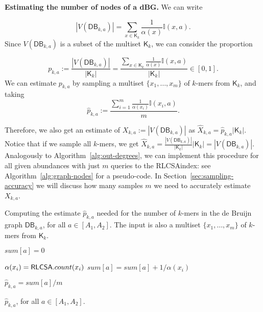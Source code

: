 \documentclass[a4paper,11pt]{article}
\newcommand{\DB}{\mathsf{DB}_{k,a}}
\newcommand{\K}{\mathsf{K}}
\newcommand{\abu}{\alpha}
\newcommand{\RLCSA}{{\sf RLCSA}}
\renewcommand{\geq}{\geqslant}
\begin{document}

\noindent \textbf{Estimating the number of nodes of a dBG.} We can write

\[|V(\DB)| = \sum_{x \in \K_k} \frac{1}{\abu(x)}\mathbb{I}(x,a).\]
Since $V(\DB)$ is a subset of the multiset $\K_k$, we can consider the proportion 

\[p_{k,a} := \frac{|V(\DB)|}{|\K_k|} = \frac{\sum_{x \in \K_k} \frac{1}{\abu(x)}\mathbb{I}(x,a)}{|\K_k|} \in [0,1].\]
%
%
We can estimate $p_{k,a}$ by sampling a multiset $\{x_1,\dots,x_m\}$ of $k$-mers from $\K_k$, and taking
\[\hat{p}_{k,a} := \frac{\sum_{i = 1}^m \frac{1}{\abu(x_i)}\mathbb{I}(x_i, a)}{m}.\]

Therefore, we also get an estimate of $X_{k,a} := |V(\DB)|$ as $\hat{X}_{k,a} = \hat{p}_{k,a}|\K_k|$. Notice that if we sample all $k$-mers, we get $\hat{X}_{k,a} = \frac{|V(\DB)|}{|\K_k|}|\K_k| = |V(\DB)|$. Analogously to Algorithm~\ref{alg:out-degrees}, we can implement this procedure for all given abundances with just $m$ queries to the \RLCSA index: see Algorithm~\ref{alg:graph-nodes} for a pseudo-code. In Section~\ref{sec:sampling-accuracy} we will discuss how many samples $m$ we need to accurately estimate $X_{k,a}$.


\begin{algorithm}[h]
\caption{Computing the estimate $\hat{p}_{k,a}$ needed for the number of $k$-mers in the de Bruijn graph $\DB$, for all $a \in [A_1,A_2]$. The input is also a multiset $\{x_1,\dots,x_m\}$ of $k$-mers from $\K_k$.\label{alg:graph-nodes}}

{
	$sum[a] = 0$\;
}

{
	$\abu(x_i) = \RLCSA.count(x_i)$\;
	\For{$a = A_1$ {\rm\bf to} $\min(\abu(x_i),A_2)$}
	{
		$sum[a] = sum[a] + 1 / \abu(x_i)$\;
	}
}

{
	$\hat{p}_{k,a} = sum[a]/m$\;
}

\Return $\hat{p}_{k,a}$, for all $a \in [A_1,A_2]$.
\end{algorithm}
\end{document}
